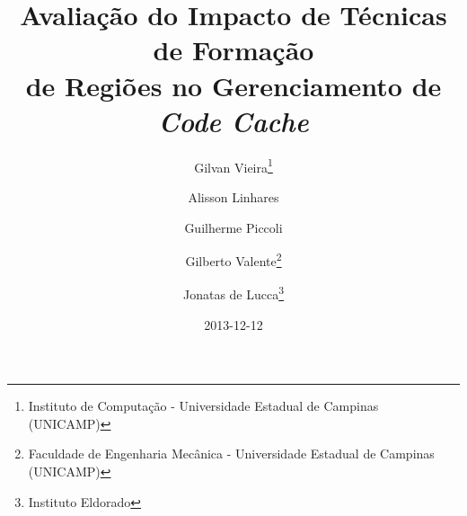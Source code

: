 \documentclass[12pt,twoside]{article}
\begin{document}
% 

%



\TRMakeCover

%
\pagestyle{myheadings}

%
\title{Avaliação do Impacto de Técnicas de Formação\\ de Regiões no Gerenciamento de \emph{Code Cache}}

\author{Gilvan Vieira\thanks{Instituto de Computação - Universidade Estadual de Campinas (UNICAMP)} \and
Alisson Linhares\footnotemark[1] \and Guilherme Piccoli\footnotemark[1] \and Gilberto Valente\thanks{Faculdade de Engenharia Mecânica - Universidade Estadual de Campinas (UNICAMP)} \and Jonatas de Lucca\thanks{Instituto Eldorado}}

\date{2013-12-12}

\maketitle



%
%  
\end{document}
